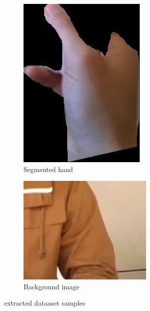 \begin{figure}
\begin{subfigure}[b]{0.3\textwidth}
        \includegraphics[width=\textwidth]{images/masked/hand231.jpg}
        \caption{Segmented hand}
        \label{fig:three sin x}
    \end{subfigure}
    \hfill
    \begin{subfigure}[b]{0.3\textwidth}
        \centering
        \includegraphics[width=\textwidth]{images/notHand/133.jpg}
        \caption{Background image}
        \label{fig:five over x}
    \end{subfigure}
       \caption{extracted dataaset samples}
       \label{fig:three graphs}
\end{figure}

